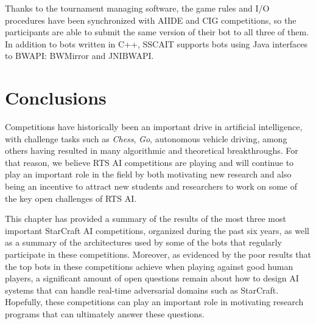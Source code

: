 \documentclass{llncs}
\begin{document}
Thanks to the tournament managing software, the game rules and I/O procedures have been synchronized with AIIDE and CIG competitions, so the participants are able to submit the same version of their bot to all three of them. In addition to bots written in C++, SSCAIT supports bots using Java interfaces to BWAPI: BWMirror and JNIBWAPI. 


\section{Conclusions}

Competitions have historically been an important drive in artificial intelligence, with challenge tasks such as {\em Chess}, {\em Go}, autonomous vehicle driving, among others having resulted in many algorithmic and theoretical breakthroughs. For that reason, we believe RTS AI competitions are playing and will continue to play an important role in the field by both motivating new research and also being an incentive to attract new students and researchers to work on some of the key open challenges of RTS AI.

This chapter has provided a summary of the results of the most three most important StarCraft AI competitions, organized during the past six years, as well as a summary of the architectures used by some of the bots that regularly participate in these competitions. Moreover, as evidenced by the poor results that the top bots in these competitions achieve when playing against good human players, a significant amount of open questions remain about how to design AI systems that can handle real-time adversarial domains such as StarCraft. Hopefully, these competitions can play an important role in motivating research programs that can ultimately answer these questions.




\end{document}
